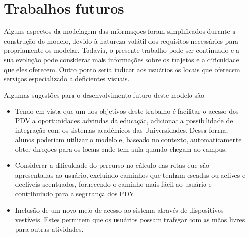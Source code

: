 \documentclass[english,brazilian]{UNISINOSmonografia}
\begin{document}
	\section{Trabalhos futuros}
Alguns aspectos da modelagem das informações foram simplificados durante a construção do modelo, devido à natureza volátil dos requisitos necessários para propriamente os modelar. Todavia, o presente trabalho pode ser continuado e a sua evolução pode considerar mais informações sobre os trajetos e a dificuldade que eles oferecem. Outro ponto seria indicar aos usuários os locais que oferecem serviços especializado a deficientes visuais.

Algumas sugestões para o desenvolvimento futuro deste modelo são:

\begin{itemize}
	\item Tendo em vista que um dos objetivos deste trabalho é facilitar o acesso dos PDV a oportunidades advindas da educação, adicionar a possibilidade de integração com os sistemas acadêmicos das Universidades. Dessa forma, alunos poderiam utilizar o modelo e, baseado no contexto, automaticamente obter direções para os locais onde tem aula quando chegam ao campus.

	\item Considerar a dificuldade do percurso no cálculo das rotas que são apresentadas ao usuário, excluindo caminhos que tenham escadas ou aclives e decliveis acentuados, fornecendo o caminho mais fácil ao usuário e contribuindo para a segurança dos PDV.

	\item Inclusão de um novo meio de acesso ao sistema através de dispositivos vestíveis. Estes permitem que os usuários possam trafegar com as mãos livres para outras atividades.
\end{itemize}


\end{document}
